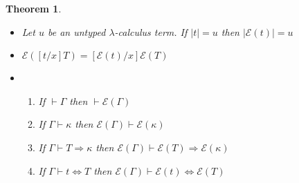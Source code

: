 \documentclass{article}
\newcommand{\tpsynth}[0]{\Rightarrow}
\newtheorem{theorem}{Theorem}
\begin{document}
\begin{theorem}
  \label{thm:iota-as-refinement}
  \ \\
  \begin{itemize}
    
  \item Let \(u\) be an untyped \(\lambda\)-calculus term.
    If \(|t| = u\) then \(|\mathcal{E}(t)| = u\)

  \item \(\mathcal{E}([t/x]T) = [\mathcal{E}(t)/x]\mathcal{E}(T)\)
  \item 
    \begin{enumerate}
    \item If \(\vdash \Gamma\) then \(\vdash \mathcal{E}(\Gamma)\)
    \item If \(\Gamma \vdash \kappa\) then \(\mathcal{E}(\Gamma) \vdash \mathcal{E}(\kappa)\)
    \item If \(\Gamma \vdash T \tpsynth \kappa\) then \(\mathcal{E}(\Gamma) \vdash
      \mathcal{E}(T) \tpsynth \mathcal{E}(\kappa)\)
    \item If \(\Gamma \vdash t \Leftrightarrow T\) then \(\mathcal{E}(\Gamma) \vdash
      \mathcal{E}(t) \Leftrightarrow \mathcal{E}(T)\)
    \end{enumerate}
  \end{itemize}
\end{theorem}
\end{document}
